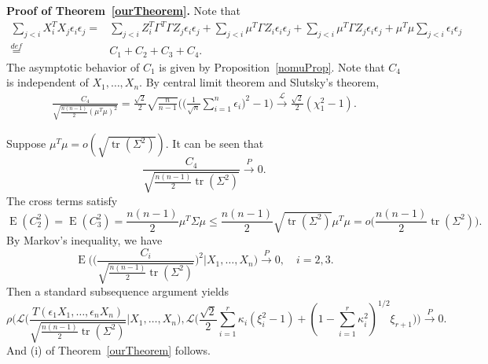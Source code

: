 \documentclass[3p]{elsarticle}
\DeclareMathOperator{\mytr}{tr}
\DeclareMathOperator{\myE}{E}
\theoremstyle{plain}
\theoremstyle{definition}
\theoremstyle{remark}
\begin{document}
\textbf{Proof of Theorem~\ref{ourTheorem}. }
Note that
    \begin{equation*}
        \begin{aligned}
            \sum_{j<i} X_i^T X_j \epsilon_i\epsilon_j
            =&
            \sum_{j<i} Z_i^T \Gamma^T \Gamma Z_j \epsilon_i\epsilon_j
            +
            \sum_{j<i} \mu^T \Gamma Z_i \epsilon_i\epsilon_j
            +\sum_{j<i} \mu^T \Gamma Z_j \epsilon_i\epsilon_j+
            \mu^T \mu \sum_{j<i} \epsilon_i\epsilon_j\\
            \overset{def}{=}&C_1+C_2+C_3+C_4.
        \end{aligned}
    \end{equation*}
    The asymptotic behavior of $C_1$ is given by Proposition~\ref{nomuProp}.
    Note that $C_4$ is independent of $X_1,\ldots,X_n$.
    By central limit theorem and Slutsky's theorem,
    \begin{equation*}
        \begin{aligned}
            \frac{C_4}
            {\sqrt{\frac{n(n-1)}{2}(\mu^T\mu)^2}}
            =\frac{\sqrt{2}}{2}\sqrt{\frac{n}{n-1}}\Big(\big(\frac{1}{\sqrt{n}}\sum_{i=1}^n \epsilon_i\big)^2-1\Big)\xrightarrow{\mathcal{L}}\frac{\sqrt{2}}{2}(\chi^2_1-1).
        \end{aligned}
    \end{equation*}

    Suppose $\mu^T \mu=o(\sqrt{\mytr(\Sigma^2)})$. It can be seen that 
    $$
        \frac{C_4}{\sqrt{\frac{n(n-1)}{2}\mytr(\Sigma^2)}}
        \xrightarrow{P} 0.
    $$
    The cross terms satisfy
    \begin{equation*}
    \myE(C_2^2)=\myE(C_3^2)=\frac{n(n-1)}{2}\mu^T \Sigma \mu
        \leq \frac{n(n-1)}{2}\sqrt{\mytr (\Sigma^2)}\mu^T\mu
        = o\Big(\frac{n(n-1)}{2}\mytr (\Sigma^2)\Big).
    \end{equation*}
    By Markov's inequality, we have
    \begin{equation*}
        \myE\Bigg(\bigg(\frac{C_i}{\sqrt{\frac{n(n-1)}{2}\mytr(\Sigma^2)}}
        \bigg)^2\Bigg|X_1,\ldots,X_n\Bigg)\xrightarrow{P} 0,\quad i=2,3.
    \end{equation*}
    Then a standard subsequence argument yields
    $$
            \rho\Bigg(\mathcal{L}\bigg(\frac{T(\epsilon_1 X_1,\ldots, \epsilon_n X_n)}{\sqrt{\frac{n(n-1)}{2}\mytr(\Sigma^2)}}\bigg| X_1,\ldots,X_n\bigg)
            ,
            \mathcal{L}\big(\frac{\sqrt{2}}{2}\sum_{i=1}^r \kappa_i (\xi_i^2-1)+(1-\sum_{i=1}^r \kappa_i^2)^{1/2} \xi_{r+1}\big)
            \Bigg)\xrightarrow{P}0.
    $$
And (i) of Theorem~\ref{ourTheorem} follows.
\end{document}

